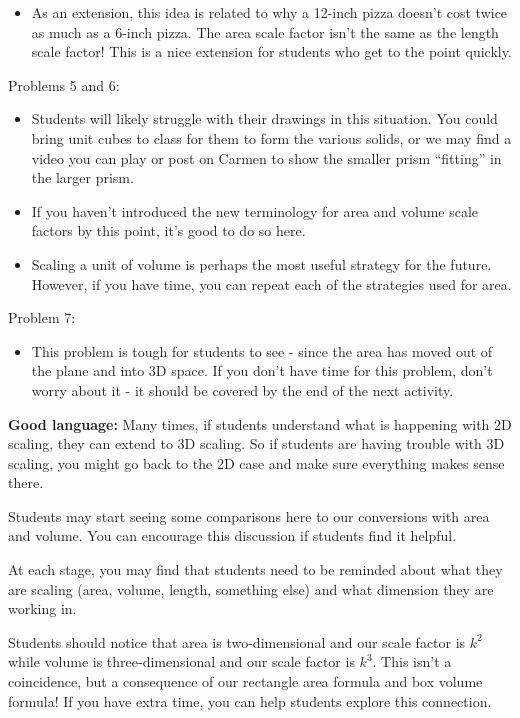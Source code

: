 \documentclass[nooutcomes,noauthor, handout]{ximera}
\begin{document}
\begin{instructorNotes}
\begin{itemize}
\item 
As an extension, this idea is related to why a 12-inch pizza doesn't cost twice as much as a 6-inch pizza. The area scale factor isn't the same as the length scale factor! This is a nice extension for students who get to the point quickly.
\end{itemize}


Problems 5 and 6:
\begin{itemize}
\item Students will likely struggle with their drawings in this situation.  You could bring unit cubes to class for them to form the various solids, or we may find a video you can play or post on Carmen to show the smaller prism ``fitting'' in the larger prism.  

\item If you haven't introduced the new terminology for area and volume scale factors by this point, it's good to do so here.

\item Scaling a unit of volume is perhaps the most useful strategy for the future. However, if you have time, you can repeat each of the strategies used for area.
\end{itemize}


Problem 7:
\begin{itemize}
\item This problem is tough for students to see - since the area has moved out of the plane and into 3D space.  If you don't have time for this problem, don't worry about it - it should be covered by the end of the next activity.
\end{itemize}





{\bf Good language:} Many times, if students understand what is happening with 2D scaling, they can extend to 3D scaling. So if students are having trouble with 3D scaling, you might go back to the 2D case and make sure everything makes sense there.


Students may start seeing some comparisons here to our conversions with area and volume. You can encourage this discussion if students find it helpful. 

At each stage, you may find that students need to be reminded about what they are scaling (area, volume, length, something else) and what dimension they are working in.

Students should notice that area is two-dimensional and our scale factor is $k^2$ while volume is three-dimensional and our scale factor is $k^3$. This isn't a coincidence, but a consequence of our rectangle area formula and box volume formula! If you have extra time, you can help students explore this connection.




\end{instructorNotes}
\end{document}
